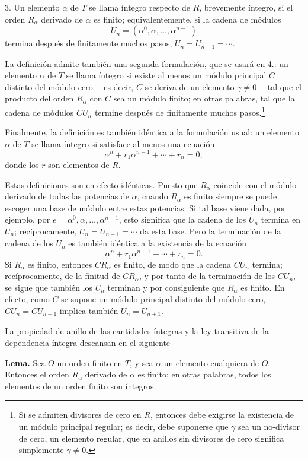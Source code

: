 \documentclass[11pt]{article}
\begin{document}
3. Un elemento $\alpha$ de $T$ se llama íntegro respecto de $R$, brevemente íntegro, si el orden $R_\alpha$ derivado de $\alpha$ es finito; equivalentemente, si la cadena de módulos
\[
        U_n=(\alpha^0,\alpha,\ldots,\alpha^{n-1})
\]
termina después de finitamente muchos pasos, $U_n=U_{n+1}=\cdots$.

La definición admite también una segunda formulación, que se usará en 4.: un elemento $\alpha$ de $T$ se llama íntegro si existe al menos un módulo principal $C$ distinto del módulo cero ---es decir, $C$ se deriva de un elemento $\gamma\ne0$--- tal que el producto del orden $R_\alpha$ con $C$ sea un módulo finito; en otras palabras, tal que la cadena de módulos $CU_n$ termine después de finitamente muchos pasos.\footnote{Si se admiten divisores de cero en $R$, entonces debe exigirse la existencia de un módulo principal regular; es decir, debe suponerse que $\gamma$ sea un no-divisor de cero, un elemento regular, que en anillos sin divisores de cero significa simplemente $\gamma\ne0$.}

Finalmente, la definición es también idéntica a la formulación usual: un elemento $\alpha$ de $T$ se llama íntegro si satisface al menos una ecuación
\[
        \alpha^n+r_1\alpha^{n-1}+\cdots+r_n=0,
\]
donde los $r$ son elementos de $R$.

Estas definiciones son en efecto idénticas. Puesto que $R_\alpha$ coincide con el módulo derivado de todas las potencias de $\alpha$, cuando $R_\alpha$ es finito siempre se puede escoger una base de módulo entre estas potencias. Si tal base viene dada, por ejemplo, por $e=\alpha^0,\alpha,\ldots,\alpha^{n-1}$, esto significa que la cadena de los $U_n$ termina en $U_n$; recíprocamente, $U_n=U_{n+1}=\cdots$ da esta base. Pero la terminación de la cadena de los $U_n$ es también idéntica a la existencia de la ecuación
\[
        \alpha^n+r_1\alpha^{n-1}+\cdots+r_n=0.
\]
Si $R_\alpha$ es finito, entonces $CR_\alpha$ es finito, de modo que la cadena $CU_n$ termina; recíprocamente, de la finitud de $CR_\alpha$, y por tanto de la terminación de los $CU_n$, se sigue que también los $U_n$ terminan y por consiguiente que $R_\alpha$ es finito. En efecto, como $C$ se supone un módulo principal distinto del módulo cero, $CU_n=CU_{n+1}$ implica también $U_n=U_{n+1}$.

La propiedad de anillo de las cantidades íntegras y la ley transitiva de la dependencia íntegra descansan en el siguiente

\medskip
\noindent\textbf{Lema.} Sea $O$ un orden finito en $T$, y sea $\alpha$ un elemento cualquiera de $O$. Entonces el orden $R_\alpha$ derivado de $\alpha$ es finito; en otras palabras, todos los elementos de un orden finito son íntegros.
\end{document}
